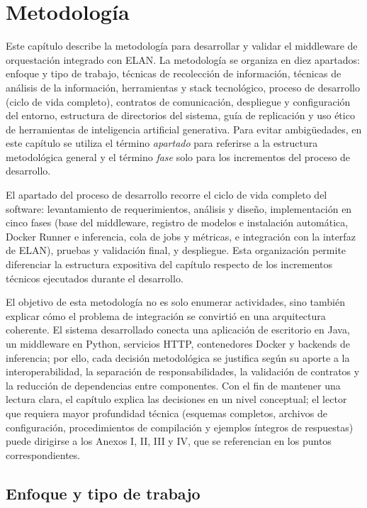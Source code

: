 \section[METODOLOGÍA]{Metodología}

Este capítulo describe la metodología para desarrollar y validar el middleware de orquestación integrado con ELAN. La metodología se organiza en diez apartados: enfoque y tipo de trabajo, técnicas de recolección de información, técnicas de análisis de la información, herramientas y stack tecnológico, proceso de desarrollo (ciclo de vida completo), contratos de comunicación, despliegue y configuración del entorno, estructura de directorios del sistema, guía de replicación y uso ético de herramientas de inteligencia artificial generativa. Para evitar ambigüedades, en este capítulo se utiliza el término \textit{apartado} para referirse a la estructura metodológica general y el término \textit{fase} solo para los incrementos del proceso de desarrollo.

El apartado del proceso de desarrollo recorre el ciclo de vida completo del software: levantamiento de requerimientos, análisis y diseño, implementación en cinco fases (base del middleware, registro de modelos e instalación automática, Docker Runner e inferencia, cola de jobs y métricas, e integración con la interfaz de ELAN), pruebas y validación final, y despliegue. Esta organización permite diferenciar la estructura expositiva del capítulo respecto de los incrementos técnicos ejecutados durante el desarrollo.

El objetivo de esta metodología no es solo enumerar actividades, sino también explicar cómo el problema de integración se convirtió en una arquitectura coherente. El sistema desarrollado conecta una aplicación de escritorio en Java, un middleware en Python, servicios HTTP, contenedores Docker y backends de inferencia; por ello, cada decisión metodológica se justifica según su aporte a la interoperabilidad, la separación de responsabilidades, la validación de contratos y la reducción de dependencias entre componentes. Con el fin de mantener una lectura clara, el capítulo explica las decisiones en un nivel conceptual; el lector que requiera mayor profundidad técnica (esquemas completos, archivos de configuración, procedimientos de compilación y ejemplos íntegros de respuestas) puede dirigirse a los Anexos I, II, III y IV, que se referencian en los puntos correspondientes.

\subsection{Enfoque y tipo de trabajo}

